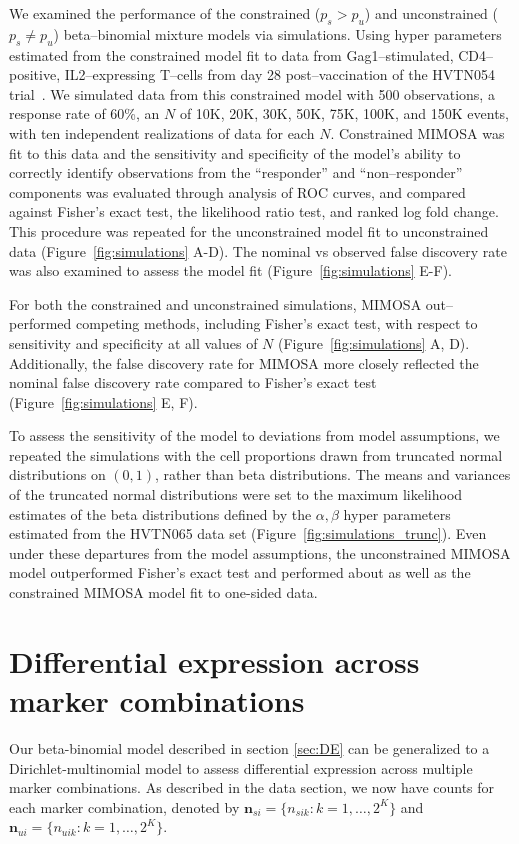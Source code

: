 \documentclass[11pt]{article}
\begin{document}
We examined the performance of the constrained ($p_s>p_u$) and unconstrained ($p_s \ne p_u$) beta--binomial mixture models via simulations. Using hyper parameters estimated from the constrained model fit to data from Gag1--stimulated, CD4--positive, IL2--expressing T--cells from day 28 post--vaccination of the HVTN054 trial~\cite{Peiperl:2010ej}. We simulated data from this constrained model with 500 observations, a response rate of 60\%, an $N$ of 10K, 20K, 30K, 50K, 75K, 100K, and 150K events, with ten independent realizations of data for each $N$. Constrained MIMOSA was fit to this data and the sensitivity and specificity of the model's ability to correctly identify observations from the ``responder'' and ``non--responder'' components was evaluated through analysis of ROC curves, and compared against Fisher's exact test, the likelihood ratio test, and ranked log fold change. This procedure was repeated for the unconstrained model fit to unconstrained data (Figure~\ref{fig:simulations} A-D). The nominal vs observed false discovery rate was also examined to assess the model fit (Figure~\ref{fig:simulations} E-F). 

For both the constrained and unconstrained simulations, MIMOSA out--performed competing methods, including Fisher's exact test, with respect to sensitivity and specificity at all values of $N$ (Figure~\ref{fig:simulations} A, D). Additionally, the false discovery rate for MIMOSA more closely reflected the nominal false discovery rate compared to Fisher's exact test (Figure~\ref{fig:simulations} E, F).

To assess the sensitivity of the model to deviations from model assumptions, we repeated the simulations with the cell proportions drawn from  truncated normal distributions on $(0,1)$, rather than beta distributions. The means and variances of the truncated normal distributions were set to the maximum likelihood estimates of the beta distributions defined by the $\alpha,\beta$ hyper parameters estimated from the HVTN065 data set (Figure~\ref{fig:simulations_trunc}). Even under these departures from the model assumptions, the unconstrained MIMOSA model outperformed Fisher's exact test and performed about as well as the constrained MIMOSA model fit to one-sided data.

\section{Differential expression across marker combinations}
Our beta-binomial model described in section \ref{sec:DE} can be generalized to a Dirichlet-multinomial model to assess differential expression across multiple marker combinations. As described in the data section, we now have counts for each marker combination, denoted by  $\mathbf{n}_{si}=\{n_{sik}: k=1,\dots,2^K\}$ and $\mathbf{n}_{ui}=\{n_{uik}: k=1,\dots,2^K\}$. 
\end{document}
